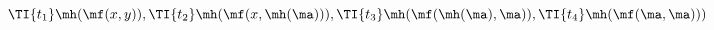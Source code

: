 
\begin{block}
$
\TI{t_1}\mh(\mf(x,y)), 
\TI{t_2}\mh(\mf(x,\mh(\ma))),
\TI{t_3}\mh(\mf(\mh(\ma),\ma)),
\TI{t_4}\mh(\mf(\ma,\ma)))
$
\end{block}